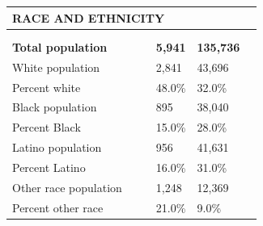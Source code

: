 \documentclass[9pt]{report}
\begin{document}
\vspace{12pt}
\setlength{\tabcolsep}{.01in} %
\begin{tabular}{p{.10in}p{.10in}p{.10in}p{3.7in}>{\hfill}p{.85in}>{\hfill}p{.85in}>{\hfill}p{.85in}>{\hfill}p{.85in}p{0.1in}}
\multicolumn{9}{l}{\parbox{7.1in}{\raggedright{\large{\strut\textbf{RACE AND ETHNICITY}\strut}}}} \\ 
\hline
\multicolumn{4}{l}{\parbox{3.5in}{\raggedright{\textbf{}}}} & \multicolumn{1}{r}{\parbox{.85in}{\strut\raggedleft{\textbf{}\strut}}} & \multicolumn{1}{r}{\parbox{.85in}{\strut\raggedleft{\textbf{}\strut}}} & \multicolumn{1}{r}{\parbox{.85in}{\strut{}}} & \multicolumn{1}{r}{\parbox{.85in}{\strut{}}} & \\ 
\multicolumn{9}{l}{} \\ 
\multicolumn{4}{l}{\parbox{3.5in}{\strut\raggedright{\textbf{Total population}\strut}}} & \textbf{} & \textbf{} & \textbf{5,941} & \textbf{135,736} & \textbf{} \\ 
\multicolumn{4}{l}{\parbox{3.6in}{\strut\raggedright{{White population}}\strut}} &  &  & 2,841 & 43,696 & \multicolumn{1}{l}{}  \\ 
\multicolumn{4}{l}{\parbox{3.6in}{\strut\raggedright{{Percent white}}\strut}} &  &  & 48.0\% & 32.0\% & \multicolumn{1}{l}{}  \\ 
\multicolumn{4}{l}{\parbox{3.6in}{\strut\raggedright{{Black population}}\strut}} &  &  & 895 & 38,040 & \multicolumn{1}{l}{}  \\ 
\multicolumn{4}{l}{\parbox{3.6in}{\strut\raggedright{{Percent Black}}\strut}} &  &  & 15.0\% & 28.0\% & \multicolumn{1}{l}{}  \\ 
\multicolumn{4}{l}{\parbox{3.6in}{\strut\raggedright{{Latino population}}\strut}} &  &  & 956 & 41,631 & \multicolumn{1}{l}{}  \\ 
\multicolumn{4}{l}{\parbox{3.6in}{\strut\raggedright{{Percent Latino}}\strut}} &  &  & 16.0\% & 31.0\% & \multicolumn{1}{l}{}  \\ 
\multicolumn{4}{l}{\parbox{3.6in}{\strut\raggedright{{Other race population}}\strut}} &  &  & 1,248 & 12,369 & \multicolumn{1}{l}{}  \\ 
\multicolumn{4}{l}{\parbox{3.6in}{\strut\raggedright{{Percent other race}}\strut}} &  &  & 21.0\% & 9.0\% & \multicolumn{1}{l}{}  \\ 

\end{tabular}
\setlength{\tabcolsep}{6pt} %
\end{document}
